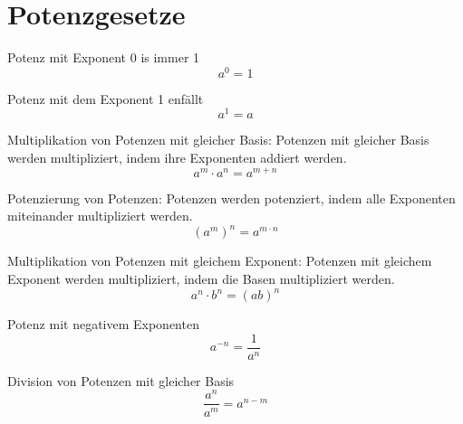 \documentclass[11pt]{article}
\begin{document}
\section{Potenzgesetze}


Potenz mit Exponent 0 is immer 1
$$ a^{0} = 1 $$

Potenz mit dem Exponent 1 enfällt
$$ a^{1} = a $$ 

Multiplikation von Potenzen mit gleicher Basis: Potenzen mit gleicher Basis werden multipliziert, indem ihre Exponenten addiert werden.
$$ a^{m} \cdot a^{n} = a^{m+n} $$

Potenzierung von Potenzen: Potenzen werden potenziert, indem alle Exponenten miteinander multipliziert werden.
$$ (a^{m})^{n} = a^{m \cdot n} $$

Multiplikation von Potenzen mit gleichem Exponent: Potenzen mit gleichem Exponent werden multipliziert, indem die Basen multipliziert werden.
$$ a^{n} \cdot b^{n} = (ab)^{n} $$

Potenz mit negativem Exponenten
$$ a^{-n} = \frac{1}{a^{n}}$$

Division von Potenzen mit gleicher Basis
$$ \frac{a^{n}}{a^{m}} = a^{n-m} $$ 
\end{document}
